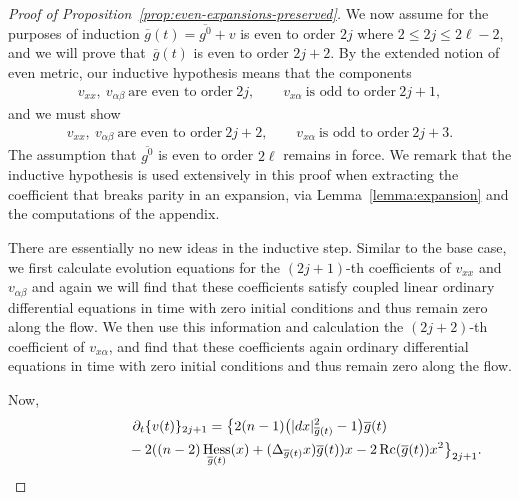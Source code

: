 \documentclass[11pt]{article}
\numberwithin{equation}{section}
\newcommand{\del}{\partial}
\newcommand{\olg}{\overline{g}}
\newcommand{\olgin}{\overline{\gin}}
\newcommand{\gin}{{g^0}}
\newcommand{\gbar}{\overline{g}}
\DeclareMathOperator{\Rc}{Rc}
\DeclareMathOperator{\hess}{Hess}
\begin{document}
\begin{proof}[Proof of Proposition~\ref{prop:even-expansions-preserved}]
We now assume for the purposes of induction $\olg(t) = \olgin + v$ is even to order $2j$ where $2 \leq 2j \leq 2\ell -2$, and we will prove that~$\olg(t)$ is even to order $2j+2$. By the extended notion of even metric, our inductive hypothesis means that the components
\begin{gather*}
 v_{xx}, \ v_{\alpha \beta}\ \mbox{are even to order} \ 2j, \qquad
 v_{x\alpha} \ \mbox{is odd to order} \ 2j+1,
\end{gather*}
and we must show
\begin{gather*}
v_{xx}, \ v_{\alpha \beta} \ \mbox{are even to order} \ 2j+2, \qquad
v_{x\alpha} \ \mbox{is odd to order} \ 2j+3.
\end{gather*}
The assumption that $\olgin$ is even to order $2\ell$ remains in force. We remark that the inductive hypothesis is used extensively in this proof when extracting the coefficient that breaks parity in an expansion, via Lemma~\ref{lemma:expansion} and the computations of the appendix.

There are essentially no new ideas in the inductive step. Similar to the base case, we first calculate evolution equations for the $(2j+1)$-th coefficients of $v_{xx}$ and $v_{\alpha \beta}$ and again we will find that these coefficients satisfy coupled linear ordinary differential equations in time with zero initial conditions and thus remain zero along the flow. We then use this information and calculation the $(2j+2)$-th coefficient of $v_{x\alpha}$, and find that these coefficients again ordinary differential equations in time with zero initial conditions and thus remain zero along the flow.

Now,
\begin{gather*}
 \del_t \{ v(t) \}_{2j+1} =\big\{ 2 (n-1) \big(|{\rm d}x|^2_{\gbar(t)} -1\big) \olg(t) \\
 \hphantom{\del_t \{ v(t) \}_{2j+1} =}{} -2 ( (n-2) \hess_{\olg(t)} (x) + (\Delta_{\olg(t)} x) \olg(t) ) x -2 \Rc(\gbar(t)) x^2 \big\}_{2j+1}.
\end{gather*}


\end{proof}
\end{document}

